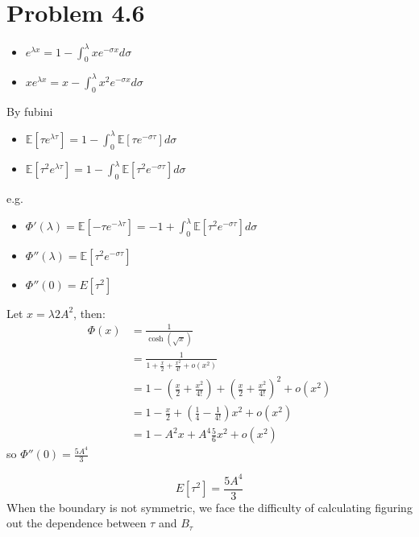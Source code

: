 \documentclass[12pt]{article}
\newcommand{\esp}{{\mathbb E}}
\newenvironment{problem}[1]
{\section*{Problem #1}}{}
\begin{document}
\begin{problem}{4.6}
  \begin{itemize}
  \item $e^{\lambda x} = 1 - \int_0^{\lambda} x e^{-\sigma x} d\sigma$
  \item $xe^{\lambda x} = x -\int_0^{\lambda} x^2 e^{-\sigma x} d\sigma$
  \end{itemize}
  By fubini
  \begin{itemize}
  \item $\esp[\tau e^{\lambda \tau}] = 1 - \int_0^{\lambda} \esp[\tau
    e^{-\sigma \tau}] d\sigma$
  \item   $\esp[\tau^2 e^{\lambda \tau}] = 1 - \int_0^{\lambda} \esp[\tau^2
    e^{-\sigma \tau}] d\sigma$
  \end{itemize}
  e.g.
  \begin{itemize}
  \item $\Phi'(\lambda) = \esp[-\tau e^{-\lambda \tau}] = -1 +
    \int_0^{\lambda} \esp[\tau^2 e^{-\sigma \tau}] d\sigma$
  \item $\Phi''(\lambda) = \esp[\tau^2 e^{-\sigma \tau}]$
  \item $\Phi''(0) = E[\tau^2]$
  \end{itemize}

  Let $x = \lambda 2 A^2$, then:
  \begin{align*}
    \Phi(x) &= \frac{1}{\cosh(\sqrt{x})}
    \\& = \frac1{1 + \frac x2 + \frac {x^2}{4!} + o(x^2)}
    \\& = 1 - (\frac x2 + \frac {x^2}{4!}) + (\frac x2 + \frac {x^2}{4!})^2 + o(x^2)
    \\&= 1 - \frac x2 + (\frac14 - \frac1{4!}) x^2 + o(x^2)
    \\&= 1 - A^2 x + A^4 \frac56 x^2 + o(x^2)
  \end{align*}
  so $\Phi''(0) = \frac{5A^4}3$
  
  $$E[\tau^2] = \frac{5A^4}3$$
  When the boundary is not symmetric, we face the difficulty of calculating figuring out the dependence between $\tau$ and $B_{\tau}$
\end{problem}
\end{document}
